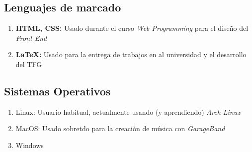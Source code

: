 \documentclass[letterpaper]{twentysecondcv-esp} %
\begin{document}
\subsection{Lenguajes de marcado}
\begin{enumerate}
	\item \textbf{HTML, CSS:} Usado durante el curso {\it Web Programming} para el diseño del {\it Front End}
	\item \textbf{\LaTeX:} Usado para la entrega de trabajos en al universidad y el desarrollo del TFG
\end{enumerate}

\subsection{Sistemas Operativos}
\begin{enumerate}
	\item Linux: Usuario habitual, actualmente usando (y aprendiendo) {\it Arch Linux}
	\item MacOS: Usado sobretdo para la creación de música con {\it GarageBand}
	\item Windows
\end{enumerate}
\end{document}
